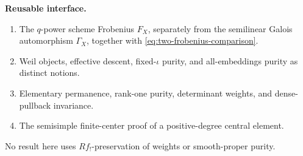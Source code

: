 \begin{formalization}
\label{form:weights-interface}
\textbf{Reusable interface.}
\begin{enumerate}
\item The \(q\)-power scheme Frobenius \(F_X\), separately from the
semilinear Galois automorphism \(\Gamma_X\), together with
\eqref{eq:two-frobenius-comparison}.
\item Weil objects, effective descent, fixed-\(\iota\) purity, and
all-embeddings purity as distinct notions.
\item Elementary permanence, rank-one purity, determinant weights, and
dense-pullback invariance.
\item The semisimple finite-center proof of a positive-degree central
element.
\end{enumerate}
No result here uses \(Rf_!\)-preservation of weights or smooth-proper
purity.
\end{formalization}
